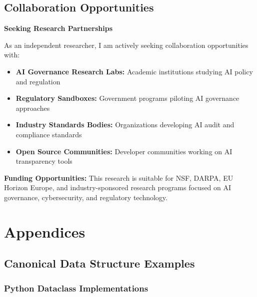 \documentclass[12pt,a4paper]{article}
\begin{document}
\subsection{Collaboration Opportunities}

\begin{executivebox}
\textbf{Seeking Research Partnerships}

As an independent researcher, I am actively seeking collaboration opportunities with:

\begin{itemize}
\item \textbf{AI Governance Research Labs:} Academic institutions studying AI policy and regulation
\item \textbf{Regulatory Sandboxes:} Government programs piloting AI governance approaches
\item \textbf{Industry Standards Bodies:} Organizations developing AI audit and compliance standards
\item \textbf{Open Source Communities:} Developer communities working on AI transparency tools
\end{itemize}

\textbf{Funding Opportunities:} This research is suitable for NSF, DARPA, EU Horizon Europe, and industry-sponsored research programs focused on AI governance, cybersecurity, and regulatory technology.
\end{executivebox}

\section{Appendices}

\subsection{Canonical Data Structure Examples}

\subsubsection{Python Dataclass Implementations}
\end{document}

